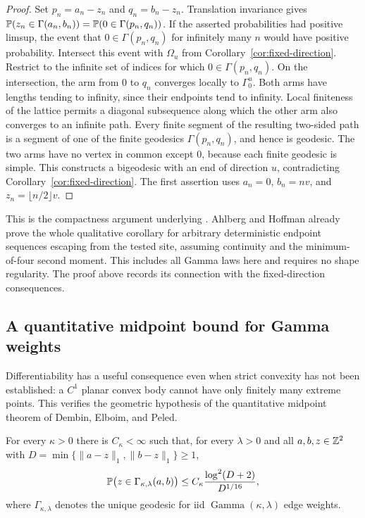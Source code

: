 \begin{proof}
Set $p_n=a_n-z_n$ and $q_n=b_n-z_n$. Translation invariance gives
$\mathbb P(z_n\in\Gamma(a_n,b_n))=
\mathbb P(0\in\Gamma(p_n,q_n))$.
If the asserted probabilities had positive limsup,
the event that $0\in\Gamma(p_n,q_n)$ for infinitely many $n$ would
have positive probability. Intersect this event with $\Omega_u$ from
Corollary~\ref{cor:fixed-direction}.
Restrict to the infinite set of indices for which
$0\in\Gamma(p_n,q_n)$. On the intersection, the arm from $0$ to $q_n$ converges locally to
$\Gamma_0^u$. Both arms have lengths tending to infinity, since their
endpoints tend to infinity. Local finiteness of the lattice permits a
diagonal subsequence along which the other arm also converges to an
infinite path. Every finite segment of the resulting two-sided path is
a segment of one of the finite geodesics $\Gamma(p_n,q_n)$, and hence
is geodesic. The two arms have no vertex in common except $0$, because
each finite geodesic is simple. This constructs a bigeodesic with an
end of direction $u$, contradicting Corollary~\ref{cor:fixed-direction}.
The first assertion uses $a_n=0$, $b_n=nv$, and
$z_n=\lfloor n/2\rfloor v$.
\end{proof}

This is the compactness argument underlying \cite[Theorem~2.1]{DH2017}.
Ahlberg and Hoffman \cite[Theorem~2.1]{AH2019} already prove the whole
qualitative corollary for arbitrary deterministic endpoint sequences
escaping from the tested site, assuming continuity and the
minimum-of-four second moment. This includes all Gamma laws here and
requires no shape regularity. The proof above records its connection
with the fixed-direction consequences.

\subsection{A quantitative midpoint bound for Gamma weights}

Differentiability has a useful consequence even when strict convexity
has not been established: a $C^1$ planar convex body cannot have only
finitely many extreme points. This verifies the geometric hypothesis
of the quantitative midpoint theorem of Dembin, Elboim, and Peled.

\begin{corollary}
\label{cor:gamma-quantitative-midpoint}
For every $\kappa>0$ there is $C_\kappa<\infty$ such that, for every
$\lambda>0$ and all $a,b,z\in\mathbb Z^2$ with
$D=\min\{\lVert a-z\rVert_1,\lVert b-z\rVert_1\}\geq1$,
\[
 \mathbb P\bigl(z\in\Gamma_{\kappa,\lambda}(a,b)\bigr)
 \leq C_\kappa\frac{\log^2(D+2)}{D^{1/16}},
\]
where $\Gamma_{\kappa,\lambda}$ denotes the unique geodesic for
iid $\operatorname{Gamma}(\kappa,\lambda)$ edge weights.
\end{corollary}

